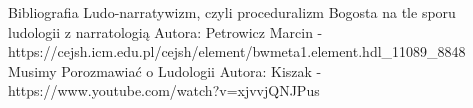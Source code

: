 \begin{frame}{Bibliografia}
Ludo-narratywizm, czyli proceduralizm Bogosta na tle sporu ludologii z narratologią Autora: Petrowicz Marcin -  https://cejsh.icm.edu.pl/cejsh/element/bwmeta1.element.hdl_11089_8848
Musimy Porozmawiać o Ludologii Autora: Kiszak - https://www.youtube.com/watch?v=xjvvjQNJPus
\end{frame}
